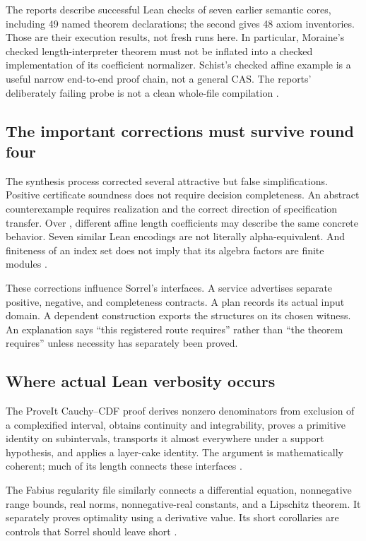 \documentclass[11pt,a4paper]{article}
\newcommand{\code}[1]{\texttt{\detokenize{#1}}}
\numberwithin{equation}{section}
\theoremstyle{definition}\newtheorem{definition}[theorem]{Definition}
\theoremstyle{remark}\newtheorem{remark}[theorem]{Remark}
\begin{document}
The reports describe successful Lean checks of seven earlier semantic cores,
including 49 named theorem declarations; the second gives 48 axiom inventories.
Those are their execution results, not fresh runs here. In particular,
Moraine's checked length-interpreter theorem must not be inflated into a
checked implementation of its coefficient normalizer. Schist's checked affine
example is a useful narrow end-to-end proof chain, not a general CAS. The
reports' deliberately failing \code{mvcgen} probe is not a clean whole-file
compilation \cite{synA,synB}.

\subsection{The important corrections must survive round four}
The synthesis process corrected several attractive but false simplifications.
Positive certificate soundness does not require decision completeness.
An abstract counterexample requires realization and the correct direction of
specification transfer. Over \code{List Empty}, different affine length
coefficients may describe the same concrete behavior. Seven similar Lean
encodings are not literally alpha-equivalent. And finiteness of an index set
does not imply that its algebra factors are finite modules
\cite{synA,synB}.

These corrections influence Sorrel's interfaces. A service advertises separate
positive, negative, and completeness contracts. A plan records its actual
input domain. A dependent construction exports the structures on its chosen
witness. An explanation says ``this registered route requires'' rather than
``the theorem requires'' unless necessity has separately been proved.

\subsection{Where actual Lean verbosity occurs}
The ProveIt Cauchy--CDF proof derives nonzero denominators from exclusion of a
complexified interval, obtains continuity and integrability, proves a primitive
identity on subintervals, transports it almost everywhere under a support
hypothesis, and applies a layer-cake identity. The argument is mathematically
coherent; much of its length connects these interfaces
\cite{cauchy}.

The Fabius regularity file similarly connects a differential equation,
nonnegative range bounds, real norms, nonnegative-real constants, and a
Lipschitz theorem. It separately proves optimality using a derivative value.
Its short corollaries are controls that Sorrel should leave short
\cite{regularity}.
\end{document}
